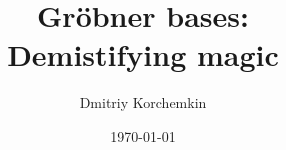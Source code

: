 
\title{Gr\"obner bases:\\Demistifying magic}
\date{\today}

\author{Dmitriy Korchemkin}

\subject{Gr\"obner bases:\\Demistifying magic}









